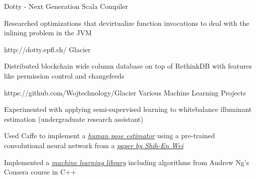 \begin{cvprojects}
  \cvproject
    {Dotty - Next Generation Scala Compiler}
    {}
    {
      \begin{cvitems}
        \item Researched optimizations that devirtualize function invocations to deal with the inlining
          problem in the JVM
      \end{cvitems}
    }
    {http://dotty.epfl.ch/}
  \cvproject
    {Glacier}
    {}
    {
      \begin{cvitems}
        \item Distributed blockchain wide column database on top of RethinkDB with features like permission control and changefeeds
      \end{cvitems}
    }
    {https://github.com/Wojtechnology/Glacier}
  \cvproject
    {Various Machine Learning Projects}
    {}
    {
      \begin{cvitems}
        \item Experimented with applying semi-supervised learning to whitebalance illuminant estimation (undergraduate research assistant)
        \item Used Caffe to implement a \textit{\href{https://github.com/Wojtechnology/WheresRares}{human pose estimator}} using a pre-trained convolutional neural network from a \textit{\href{https://arxiv.org/abs/1602.00134}{paper by Shih-En Wei}}
        \item Implemented a \textit{\href{https://github.com/Wojtechnology/ML}{machine learning library}} including algorithms from Andrew Ng's Cousera course in C++
      \end{cvitems}
    }
    {}
\end{cvprojects}
